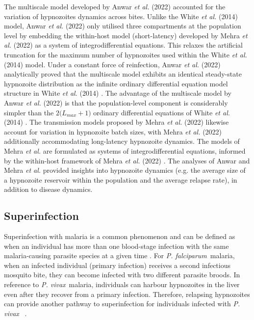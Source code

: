\documentclass[12pt]{article}
\newcommand{\pv}{\textit{P. vivax}}
\newcommand{\pf}{\textit{P. falciparum}}
\newcommand{\etal}{\textit{et al. }}
\begin{document}
The multiscale model developed by Anwar \textit{et al.} (2022) \cite{anwar2022multiscale} accounted for the variation of hypnozoites dynamics across bites. Unlike the White \etal(2014) \cite{white2014modelling} model,  Anwar \textit{et al.} (2022)  only utilised three compartments at the population level by embedding the within-host model (short-latency) developed by Mehra \etal(2022) \cite{mehra2022hypnozoite} as a system of integrodifferential equations. This relaxes the artificial truncation for the maximum number of hypnozoites used within the White \etal(2014) \cite{white2014modelling} model. Under a constant force of reinfection, Anwar \textit{et al.} (2022) \cite{anwar2022multiscale} analytically proved that the multiscale model \cite{anwar2022multiscale} exhibits an identical steady-state hypnozoite distribution as the infinite ordinary differential equation model structure in White \etal(2014) \cite{white2014modelling}.  The advantage of the multiscale model by Anwar \textit{et al.} (2022) \cite{anwar2022multiscale} is that the population-level component is considerably simpler than the $2\big(L_{max}+1\big)$ ordinary differential equations of White \textit{et al.} (2014) \cite{white2014modelling}. The transmission models proposed by Mehra \textit{et al.} (2022) \cite{thesis_somya} likewise account for variation in hypnozoite batch sizes, with Mehra \textit{et al.} (2022) \cite{thesis_somya} additionally accommodating long-latency hypnozoite dynamics. The models of Mehra \textit{et al.} \cite{thesis_somya} are formulated as systems of integrodifferential equations, informed by the within-host framework of Mehra \textit{et al.} (2022) \cite{mehra2022hypnozoite}. The analyses of Anwar and Mehra \textit{et al.} \cite{anwar2022multiscale, thesis_somya} provided insights into hypnozoite dynamics (e.g. the average size of a hypnozoite reservoir within the population and the average relapse rate), in addition to disease dynamics.

 
\subsection{Superinfection} 
Superinfection with malaria is a common phenomenon and can be defined as when an individual has more than one blood-stage infection with the same malaria-causing parasite species at a given time  \cite{smith2010quantitative}. For \pf~malaria, when an infected individual (primary infection) receives a second infectious mosquito bite, they can become infected with two different parasite broods. In reference to \pv~malaria, individuals can harbour hypnozoites in the liver even after they recover from a primary infection. Therefore, relapsing hypnozoites can provide another pathway to superinfection for individuals infected with \pv~ \cite{portugal2011superinfection,smith2010quantitative}. 
\end{document}
